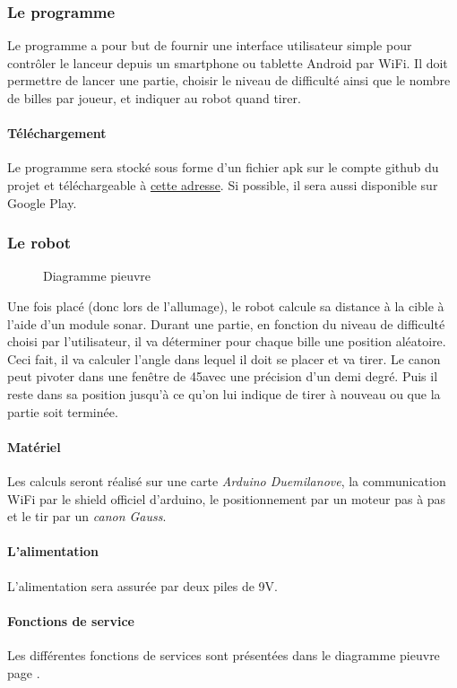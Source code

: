 \documentclass{article}
\begin{document}
\subsubsection{Le programme}
Le programme a pour but de fournir une interface utilisateur simple pour contrôler le lanceur depuis un smartphone ou tablette Android par WiFi. Il doit permettre de lancer une partie, choisir le niveau de difficulté ainsi que le nombre de billes par joueur, et indiquer au robot quand tirer.
\paragraph{Téléchargement} Le programme sera stocké sous forme d'un fichier apk sur le compte github du projet et téléchargeable à \href{https://github.com/Lanceur-billes-TPE}{cette adresse}. Si possible, il sera aussi disponible sur Google Play.

\subsubsection{Le robot}
\begin{figure}
	\begin{center}
		
	\end{center}
	\caption{Diagramme pieuvre}
	\label{pieuvre}
\end{figure}

Une fois placé (donc lors de l'allumage), le robot calcule sa distance à la cible à l'aide d'un module sonar. Durant une partie, en fonction du niveau de difficulté choisi par l'utilisateur, il va déterminer pour chaque bille une position aléatoire. Ceci fait, il va calculer l'angle dans lequel il doit se placer et va tirer. Le canon peut pivoter dans une fenêtre de 45\degre avec une précision d'un demi degré. Puis il reste dans sa position jusqu'à ce qu'on lui indique de tirer à nouveau ou que la partie soit terminée.
\paragraph{Matériel} Les calculs seront réalisé sur une carte \emph{Arduino Duemilanove}, la communication WiFi par le shield officiel d'arduino, le positionnement par un moteur pas à pas et le tir par un \emph{canon Gauss}.
\paragraph{L'alimentation}
L'alimentation sera assurée par deux piles de 9V.
\paragraph{Fonctions de service} Les différentes fonctions de services sont présentées dans le diagramme pieuvre page \pageref{pieuvre}.
\end{document}
